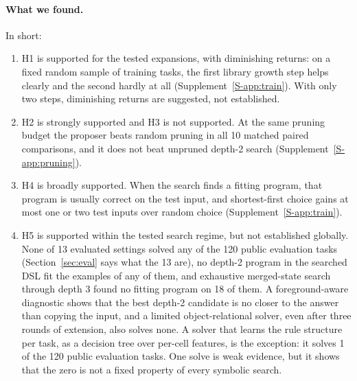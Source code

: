 \documentclass[sigconf,nonacm]{acmart}
\begin{document}
\paragraph{What we found.} In short:
\begin{enumerate}
  \item H1 is supported for the tested expansions, with diminishing returns: on a fixed random sample of training tasks, the first library growth step helps clearly and the second hardly at all (Supplement~\ref{S-app:train}). With only two steps, diminishing returns are suggested, not established.
  \item H2 is strongly supported and H3 is not supported. At the same pruning budget the proposer beats random pruning in all 10 matched paired comparisons, and it does not beat unpruned depth-2 search (Supplement~\ref{S-app:pruning}).
  \item H4 is broadly supported. When the search finds a fitting program, that program is usually correct on the test input, and shortest-first choice gains at most one or two test inputs over random choice (Supplement~\ref{S-app:train}).
  \item H5 is supported within the tested search regime, but not established globally. None of 13 evaluated settings solved any of the 120 public evaluation tasks (Section~\ref{sec:eval} says what the 13 are), no depth-2 program in the searched DSL fit the examples of any of them, and exhaustive merged-state search through depth 3 found no fitting program on 18 of them. A foreground-aware diagnostic shows that the best depth-2 candidate is no closer to the answer than copying the input, and a limited object-relational solver, even after three rounds of extension, also solves none. A solver that learns the rule structure per task, as a decision tree over per-cell features, is the exception: it solves 1 of the 120 public evaluation tasks. One solve is weak evidence, but it shows that the zero is not a fixed property of every symbolic search.
\end{enumerate}
\end{document}
